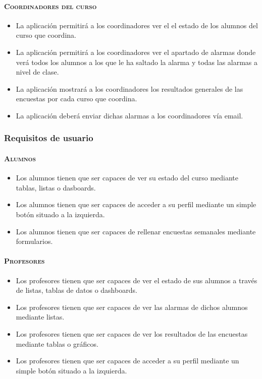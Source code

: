 \paragraph{\textsc {Coordinadores del curso}}
\begin{itemize}
\item {La aplicación permitirá a los coordinadores ver el el estado de
  los alumnos del curso que coordina.}
\item {La aplicación permitirá a los coordinadores ver el apartado de
  alarmas donde verá todos los alumnos a los que le ha saltado la
  alarma y todas las alarmas a nivel de clase.}
\item {La aplicación mostrará a los coordinadores los resultados
  generales de las encuestas por cada curso que coordina.}
\item {La aplicación deberá enviar dichas alarmas a los coordinadores
  vía email.}
\end{itemize}
\subsubsection{Requisitos de usuario}
\paragraph{\textsc {Alumnos}}
\begin{itemize}
\item {Los alumnos tienen que ser capaces de ver su estado del curso
  mediante tablas, listas o dasboards.}
\item {Los alumnos tienen que ser capaces de acceder a su perfil
  mediante un simple botón situado a la izquierda. }
\item {Los alumnos tienen que ser capaces de rellenar encuestas
  semanales mediante formularios.}
\end{itemize}
\paragraph{\textsc {Profesores}}
\begin{itemize}
\item {Los profesores tienen que ser capaces de ver el estado de sus
  alumnos a través de listas, tablas de datos o dashboards.}
\item {Los profesores tienen que ser capaces de ver las alarmas de
  dichos alumnos mediante listas.}
\item {Los profesores tienen que ser capaces de ver los resultados de
  las encuestas mediante tablas o gráficos.}
\item {Los profesores tienen que ser capaces de acceder a su perfil
  mediante un simple botón situado a la izquierda.}
\end{itemize}
